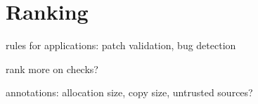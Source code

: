 \section{Ranking}

rules for applications: patch validation, bug detection

rank more on checks?

annotations: allocation size, copy size, untrusted sources?
